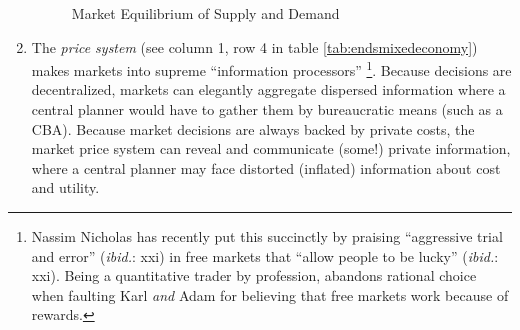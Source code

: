 \begin{enumerate}
\begin{figure}[htbp]
		\caption{Market Equilibrium of Supply and Demand}
		\label{fig:supply-demand}
	\end{figure}
	\item The \emph{price system} (see column 1, row 4 in table \ref{tab:endsmixedeconomy}) makes markets into supreme ``information processors'' \citep{Hayek1931}\footnote{
		Nassim Nicholas \cite{Taleb2007} has recently put this succinctly by praising ``aggressive trial and error'' (\emph{ibid.}: xxi) in free markets that ``allow people to be lucky'' (\emph{ibid.}: xxi). Being a quantitative trader by profession, \cite{Taleb2007} abandons rational choice when faulting Karl \cite{Marx-1867-aa} \emph{and} Adam \cite{Smith-1776-lq} for believing that free markets work because of rewards.}. 
	Because decisions are decentralized, markets can elegantly aggregate dispersed information where a central planner would have to gather them by bureaucratic means (such as a \gls{CBA}). Because market decisions are always backed by private costs, the market price system can reveal and communicate (some!) private information, where a central planner may face distorted (inflated) information about cost and utility.
\end{enumerate}

